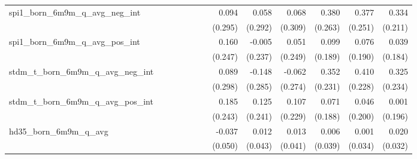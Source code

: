 \begin{tabular}{lrrrrrrrrrrrr}
spi1\_born\_6m9m\_q\_avg\_neg\_int          &              &              &              &              &              &              &        0.094 &        0.058 &        0.068 &        0.380 &        0.377 &        0.334 \\ 
                                            &              &              &              &              &              &              &      (0.295) &      (0.292) &      (0.309) &      (0.263) &      (0.251) &      (0.211) \\ 
spi1\_born\_6m9m\_q\_avg\_pos\_int          &              &              &              &              &              &              &        0.160 &       -0.005 &        0.051 &        0.099 &        0.076 &        0.039 \\ 
                                            &              &              &              &              &              &              &      (0.247) &      (0.237) &      (0.249) &      (0.189) &      (0.190) &      (0.184) \\ 
stdm\_t\_born\_6m9m\_q\_avg\_neg\_int       &              &              &              &              &              &              &        0.089 &       -0.148 &       -0.062 &        0.352 &        0.410 &        0.325 \\ 
                                            &              &              &              &              &              &              &      (0.298) &      (0.285) &      (0.274) &      (0.231) &      (0.228) &      (0.234) \\ 
stdm\_t\_born\_6m9m\_q\_avg\_pos\_int       &              &              &              &              &              &              &        0.185 &        0.125 &        0.107 &        0.071 &        0.046 &        0.001 \\ 
                                            &              &              &              &              &              &              &      (0.243) &      (0.241) &      (0.229) &      (0.188) &      (0.200) &      (0.196) \\ 
hd35\_born\_6m9m\_q\_avg                    &              &              &              &              &              &              &       -0.037 &        0.012 &        0.013 &        0.006 &        0.001 &        0.020 \\ 
                                            &              &              &              &              &              &              &      (0.050) &      (0.043) &      (0.041) &      (0.039) &      (0.034) &      (0.032) \\ 

\end{tabular}
